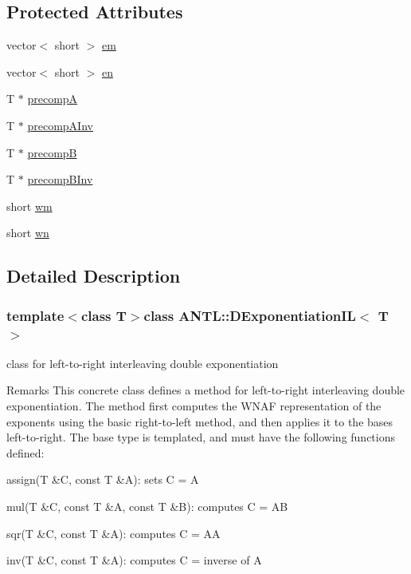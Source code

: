 \subsection*{Protected Attributes}
\begin{DoxyCompactItemize}
\item 
vector$<$ short $>$ \hyperlink{classANTL_1_1DExponentiationIL_a74c7cd8f99ea1d74985b8792b4cd7df7}{em}
\item 
vector$<$ short $>$ \hyperlink{classANTL_1_1DExponentiationIL_abb28e5efa2941fa9a0b35644b7d45697}{en}
\item 
T $\ast$ \hyperlink{classANTL_1_1DExponentiationIL_a384794528ac65b531a5d6efccae95660}{precomp\-A}
\item 
T $\ast$ \hyperlink{classANTL_1_1DExponentiationIL_ab625cc0aeda76cadee38cfeaa853c4bc}{precomp\-A\-Inv}
\item 
T $\ast$ \hyperlink{classANTL_1_1DExponentiationIL_af58aee3d8912d02a730f54c208f36602}{precomp\-B}
\item 
T $\ast$ \hyperlink{classANTL_1_1DExponentiationIL_ab1f51eb99a5f501042ab1ee779e9e9f3}{precomp\-B\-Inv}
\item 
short \hyperlink{classANTL_1_1DExponentiationIL_ab658a1ad3e54814f114b4ebd2c7b63a1}{wm}
\item 
short \hyperlink{classANTL_1_1DExponentiationIL_a159d7e6f874fcb3223f4aa4b6f5b3f78}{wn}
\end{DoxyCompactItemize}


\subsection{Detailed Description}
\subsubsection*{template$<$class T$>$class A\-N\-T\-L\-::\-D\-Exponentiation\-I\-L$<$ T $>$}

class for left-\/to-\/right interleaving double exponentiation 

\begin{DoxyRemark}{Remarks}
This concrete class defines a method for left-\/to-\/right interleaving double exponentiation. The method first computes the W\-N\-A\-F representation of the exponents using the basic right-\/to-\/left method, and then applies it to the bases left-\/to-\/right. The base type is templated, and must have the following functions defined\-:
\begin{DoxyItemize}
\item assign(\-T \&\-C, const T \&\-A)\-: sets C = A
\item mul(\-T \&\-C, const T \&\-A, const T \&\-B)\-: computes C = A\-B
\item sqr(\-T \&\-C, const T \&\-A)\-: computes C = A\-A
\item inv(\-T \&\-C, const T \&\-A)\-: computes C = inverse of A 
\end{DoxyItemize}
\end{DoxyRemark}


